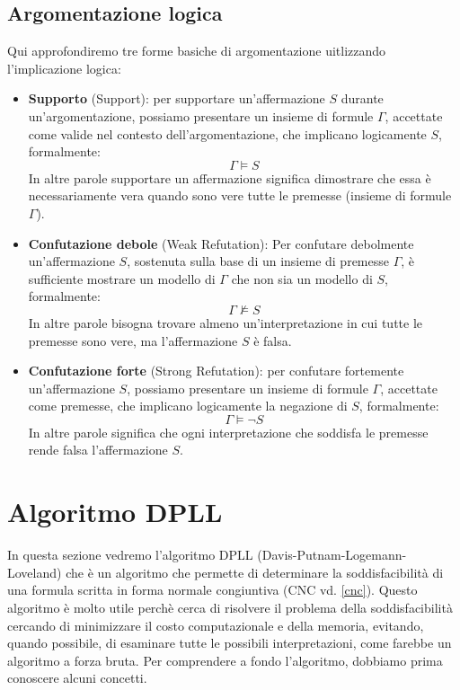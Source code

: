 \subsection{Argomentazione logica}
Qui approfondiremo tre forme basiche di argomentazione uitlizzando l'implicazione logica:
\begin{itemize}
    \item \textbf{Supporto} (Support): per supportare un'affermazione $S$ durante un'argomentazione, possiamo presentare un insieme di formule 
    \(\Gamma\), accettate come valide nel contesto dell'argomentazione, che implicano logicamente \(S\), formalmente:
    \[   \Gamma \models S  \]
    In altre parole supportare un affermazione significa dimostrare che essa è necessariamente vera quando sono vere tutte le premesse (insieme di formule $\Gamma$).

    \item \textbf{Confutazione debole} (Weak Refutation): Per confutare debolmente un'affermazione \(S\), sostenuta sulla base di un insieme di premesse \(\Gamma\), 
    è sufficiente mostrare un modello di \(\Gamma\) che non sia un modello di \(S\), formalmente:
    \[   \Gamma \not\models S     \]
    In altre parole bisogna trovare almeno un'interpretazione in cui tutte le premesse sono vere, ma l'affermazione $S$ è falsa.

    \item \textbf{Confutazione forte} (Strong Refutation): per confutare fortemente un'affermazione \(S\), possiamo presentare un insieme di formule \(\Gamma\), 
    accettate come premesse, che implicano logicamente la negazione di \(S\), formalmente:
    \[   \Gamma \models \neg S      \]
    In altre parole significa che ogni interpretazione che soddisfa le premesse rende falsa l'affermazione $S$.
\end{itemize}


\section{Algoritmo DPLL}
In questa sezione vedremo l'algoritmo DPLL (Davis-Putnam-Logemann-Loveland) che è un algoritmo 
che permette di determinare la soddisfacibilità di una formula scritta in forma normale 
congiuntiva (CNC vd. \ref{cnc}). Questo algoritmo è molto utile perchè cerca di risolvere il 
problema della soddisfacibilità cercando di minimizzare il costo computazionale e della memoria,
evitando, quando possibile, di esaminare tutte le possibili interpretazioni, come farebbe un algoritmo a forza bruta. 
Per comprendere a fondo l'algoritmo, dobbiamo prima conoscere alcuni concetti.

